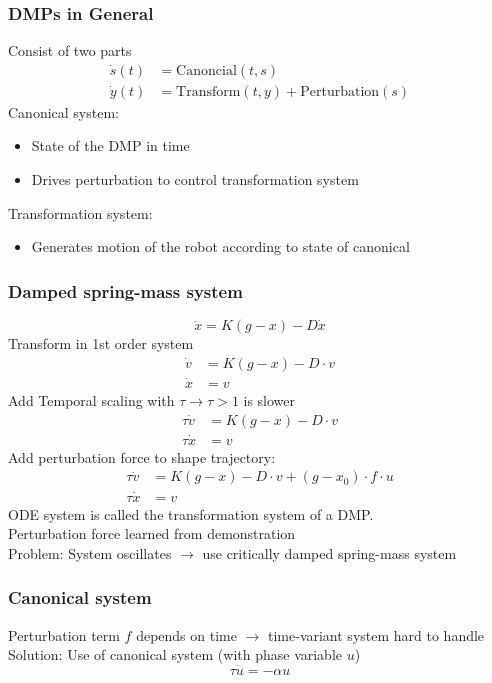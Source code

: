 \subsubsection{DMPs in General}%
\label{ar:ssub:dmps_in_general}
Consist of two parts
\begin{align}
  \dot{s}(t) &= \text{Canoncial}(t, s)\\
  \dot{y}(t) &= \text{Transform}(t, y) + \text{Perturbation}(s)
\end{align}
Canonical system:
\begin{itemize}
\item State of the DMP in time
\item Drives perturbation to control transformation system
\end{itemize}

Transformation system:
\begin{itemize}
\item Generates motion of the robot according to state of canonical
\end{itemize}

\subsubsection{Damped spring-mass system}%
\label{ar:ssub:damped_spring_mass_system}
\[\ddot{x} = K(g-x)-D\dot{x}\]
Transform in 1st order system
\begin{align*}
  \dot{v} &= K(g-x) - D \cdot v\\
  \dot{x} &= v
\end{align*}
Add Temporal scaling with \(\tau \rightarrow \tau > 1\) is slower
\begin{align*}
  \tau\dot{v} &= K(g-x) - D \cdot v\\
  \tau\dot{x} &= v
\end{align*}
Add perturbation force to shape trajectory:
\begin{align*}
  \tau\dot{v} &= K(g-x) - D \cdot v + (g - x_0) \cdot f \cdot u\\
  \tau\dot{x} &= v
\end{align*}
ODE system is called the transformation system of a DMP.\\
Perturbation force learned from demonstration\\

Problem: System oscillates \(\rightarrow\) use critically damped spring-mass system

\subsubsection{Canonical system}%
\label{ar:ssub:canonical_system}
Perturbation term \(f\) depends on time \(\rightarrow\) time-variant system hard to handle\\
Solution: Use of canonical system (with phase variable \(u\))
\[\tau \dot{u} = - \alpha u\]


